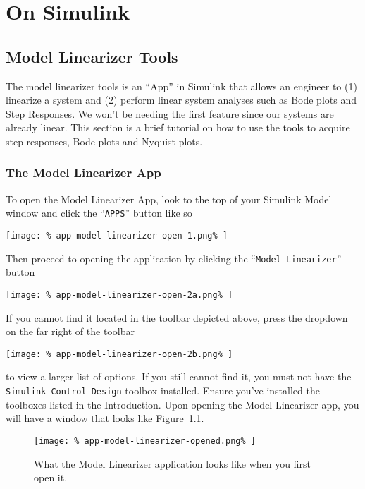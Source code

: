 \chapter{On Simulink}\label{App:Simulink}

\section{Model Linearizer Tools}\label{App:Simulink:ModelLinearizer}
The model linearizer tools is an ``App'' in Simulink that allows an engineer to
(1) linearize a system and (2) perform linear system analyses such as Bode
plots and Step Responses. We won't be needing the first feature since our
systems are already linear. This section is a brief tutorial on how to use
the tools to acquire step responses, Bode plots and Nyquist plots.

\subsection{The Model Linearizer App}
To open the Model Linearizer App, look to the top of your Simulink Model
window and click the ``\texttt{APPS}'' button like so
%
\begin{center}
  \texttt{[image: \%
    app-model-linearizer-open-1.png\%
  ]}
\end{center}
%
Then proceed to opening the application by clicking the ``\texttt{Model
Linearizer}'' button
%
\begin{center}
  \texttt{[image: \%
    app-model-linearizer-open-2a.png\%
  ]}
\end{center}
%
If you cannot find it located in the toolbar depicted above, press the
dropdown on the far right of the toolbar
%
\begin{center}
  \texttt{[image: \%
    app-model-linearizer-open-2b.png\%
  ]}
\end{center}
%
to view a larger list of options.
If you still cannot find it, you must not have the \texttt{Simulink Control Design} toolbox installed. Ensure you've installed the toolboxes listed in the
Introduction. Upon opening the Model Linearizer app, you
will have a window that looks like Figure~\ref{fig:app1:model-linearizer}.
%
\begin{figure}[H]
  \centering
  \texttt{[image: \%
    app-model-linearizer-opened.png\%
  ]}
  \caption[The Model Linearizer App]{%
    What the Model Linearizer application looks like when you first open it.%
  }
  \label{fig:app1:model-linearizer}
\end{figure}

